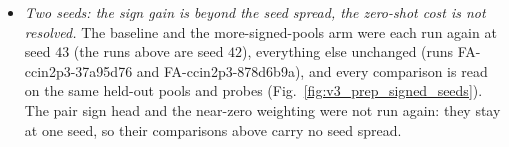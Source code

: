 \documentclass[11pt]{article}
\begin{document}
\begin{itemize}
    $u\bar u\to e^+e^-Z$, all positive in validation, which the baseline calls $90\%$ negative and this arm $0.3\%$.
    $e^+e^-\to c\bar cg$ stays at $71\%$ wrong. The size moves the other way: the zero-shot MSE on
    $\log|\mathcal M|^2$ per held-out probe over the baseline's has the median $1.07$ (above $1$ on $355$ of the $617$
    probes), $0.86$ on the one-loop axis (median MSE $0.84$ against $1.25$) but $1.17$ on $2\to5$ and $1.36$ on the
    $1$ to $10$\,TeV axis; the magnitude's MSE on the $17$ sign-changing pools is $1.42$ against $1.25$. One seed;
    the second seeds follow.
  \item \emph{Two seeds: the sign gain is beyond the seed spread, the zero-shot cost is not resolved.} The baseline and
    the more-signed-pools arm were each run again at seed $43$ (the runs above are seed $42$), everything else unchanged
    (runs FA-ccin2p3-37a95d76 and FA-ccin2p3-878d6b9a), and every comparison is read on the same held-out pools and
    probes (Fig.~\ref{fig:v3_prep_signed_seeds}). The pair sign head and the near-zero weighting were not run again:
    they stay at one seed, so their comparisons above carry no seed spread.

\end{itemize}
\end{document}
